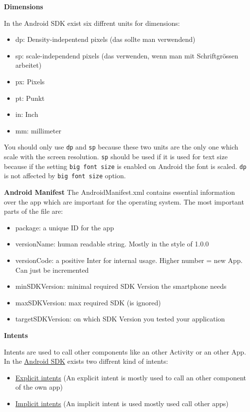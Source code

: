 \documentclass[11pt,twoside,landscape]{article}
\begin{document}
\begin{multicols}{3}
\textbf{Dimensions}

In the Android SDK exist six diffrent units for dimensions:
\begin{itemize}
\item dp: Density-indepentend pixels (das sollte man verwendend)
\item sp: scale-independend pixels (das verwenden, wenn man mit Schriftgrössen arbeitet)
\item px: Pixels
\item pt: Punkt
\item in: Inch
\item mm: millimeter
\end{itemize}


You should only use \texttt{dp} and \texttt{sp} because these two units are the only one which scale with the screen resolution.
\texttt{sp} should be used if it is used for text size because if the setting \texttt{big font size} is enabled on Android the font is scaled.
\texttt{dp} is not affected by \texttt{big font size} option.


\textbf{Android Manifest}
The AndroidManifest.xml contains essential information over the app which are important for the operating system.
The most important parts of the file are:
\begin{itemize}
\item package: a unique ID for the app
\item versionName: human readable string. Mostly in the style of 1.0.0
\item versionCode: a positive Inter for internal usage. Higher number = new App. Can just be incremented
\item minSDKVersion: minimal required SDK Version the smartphone needs
\item maxSDKVersion: max required SDK (is ignored)
\item targetSDKVersion: on which SDK Version you tested your application
\end{itemize}


\textbf{Intents}

Intents are used to call other components like an other Activity or an other App.
In the \href{../../../roam/20210928175951-android_sdk.org}{Android SDK} exists two diffrent kind of intents:
\begin{itemize}
\item \href{../../../roam/20211002180419-explicit_intents.org}{Explicit intents} (An explicit intent is mostly used to call an other component of the own app)
\item \href{../../../roam/20211002180703-implicit_intents.org}{Implicit intents} (An implicit intent is used mostly used call other apps)
\end{itemize}


\end{multicols}
\end{document}
